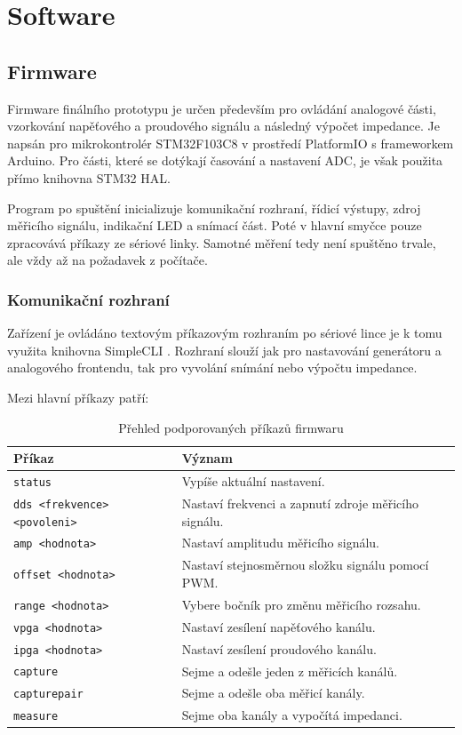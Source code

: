 \chapter{Software}

\section{Firmware}

Firmware finálního prototypu je určen především pro ovládání analogové části, vzorkování napěťového a proudového signálu a následný výpočet impedance. 
Je napsán pro mikrokontrolér STM32F103C8 v prostředí PlatformIO s frameworkem Arduino. 
Pro části, které se dotýkají časování a nastavení ADC, je však použita přímo knihovna STM32 HAL.

Program po spuštění inicializuje komunikační rozhraní, řídicí výstupy, zdroj měřicího signálu, indikační LED a snímací část. 
Poté  v hlavní smyčce pouze zpracovává příkazy ze sériové linky. 
Samotné měření tedy není spuštěno trvale, ale vždy až na požadavek z počítače.

\subsection{Komunikační rozhraní}

Zařízení je ovládáno textovým příkazovým rozhraním po sériové lince je k tomu využita knihovna SimpleCLI \cite{SimpleCLI}. 
Rozhraní slouží jak pro nastavování generátoru a analogového frontendu, tak pro vyvolání snímání nebo výpočtu impedance.

Mezi hlavní příkazy patří:
\begin{table}[H]
    \centering
    \small
    \begin{tabular}{ll}
        \toprule
        Příkaz & Význam \\
        \midrule
        \texttt{status} & Vypíše aktuální nastavení. \\
        \texttt{dds <frekvence> <povoleni>} & Nastaví frekvenci a zapnutí zdroje měřicího signálu. \\
        \texttt{amp <hodnota>} & Nastaví amplitudu měřicího signálu. \\
        \texttt{offset <hodnota>} & Nastaví stejnosměrnou složku signálu pomocí PWM. \\
        \texttt{range <hodnota>} & Vybere bočník pro změnu měřicího rozsahu. \\
        \texttt{vpga <hodnota>} & Nastaví zesílení napěťového kanálu. \\
        \texttt{ipga <hodnota>} & Nastaví zesílení proudového kanálu. \\
        \texttt{capture} & Sejme a odešle jeden z měřicích kanálů. \\
        \texttt{capturepair} & Sejme a odešle oba měřicí kanály. \\
        \texttt{measure} & Sejme oba kanály a vypočítá impedanci. \\
        \bottomrule
    \end{tabular}
    \caption{Přehled podporovaných příkazů firmwaru}
    \label{tab:firmware_prikazy}
\end{table}

